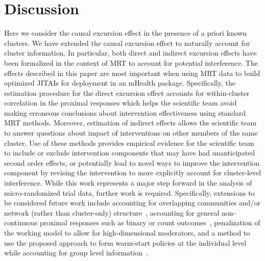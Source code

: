 \documentclass[lineno]{biometrika}
\begin{document}
\section{Discussion}

Here we consider the causal excursion effect in the presence of a priori known clusters.  We have extended the causal excursion effect to naturally account for cluster information. In particular, both direct and indirect excursion effects have been formalized in the context of MRT to account for potential interference.  The effects described in this paper are most important when using MRT data to build optimized JITAIs for deployment in an mHealth package. Specifically, the estimation procedure for the direct excursion effect accounts for within-cluster correlation in the proximal responses which helps the scientific team avoid making erroneous conclusions about intervention effectiveness using standard MRT methods.  Moreover, estimation of indirect effects allows the scientific team to answer questions about impact of interventions on other members of the same cluster.  Use of these methods provides empirical evidence for the scientific team to include or exclude intervention components that may have had unanticipated second order effects, or potentially lead to novel ways to improve the intervention component by revising the intervention to more explicitly account for cluster-level interference. While this work represents a major step forward in the analysis of micro-randomized trial data, further work is required.  Specifically, extensions to be considered future work include accounting for overlapping communities and/or network (rather than cluster-only) structure~\citep{Ogburn2014,Mealli2019}, accounting for general non-continuous proximal responses such as binary or count outcomes~\citep{Qian2021}, penalization of the working model to allow for high-dimensional moderators, and a method to use the proposed approach to form warm-start policies at the individual level while accounting for group level information~\citep{Luckett2020}.


\end{document}
